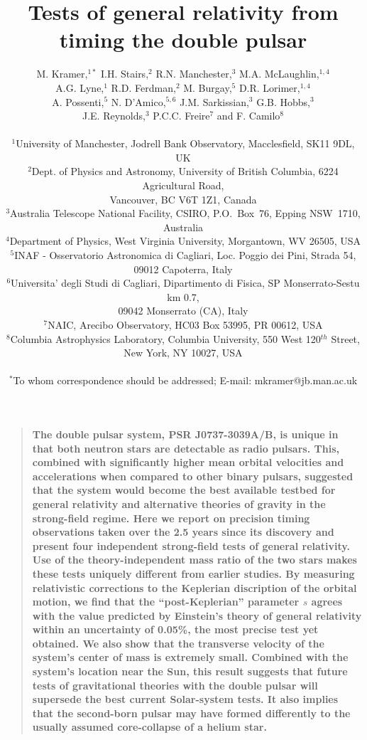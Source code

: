 \documentclass[12pt,psfig]{article}
\title{Tests of general relativity from timing the double pulsar}
\author{M. Kramer,$^{1\ast}$ I.H. Stairs,$^{2}$ R.N. Manchester,$^{3}$
  M.A. McLaughlin,$^{1,4}$ \\
A.G. Lyne,$^{1}$ R.D. Ferdman,$^{2}$ M. Burgay,$^{5}$ D.R. Lorimer,$^{1,4}$ \\
 A. Possenti,$^{5}$  N. D'Amico,$^{5,6}$ 
  J.M. Sarkissian,$^{3}$ G.B. Hobbs,$^{3}$ \\
J.E. Reynolds,$^{3}$ P.C.C. Freire$^{7}$ and F. Camilo$^{8}$ \\
\\
\normalsize{$^{1}$University of Manchester, Jodrell Bank Observatory, Macclesfield, SK11 9DL, UK}\\
\normalsize{$^{2}$Dept. of Physics and Astronomy, University of British
Columbia, 6224 Agricultural Road,}\\
\normalsize{Vancouver, BC V6T 1Z1, Canada}\\
\normalsize{$^{3}$Australia Telescope National Facility, CSIRO, P.O.~Box~76, Epping
NSW~1710, Australia}\\
\normalsize{$^{4}$Department of Physics, West Virginia University, Morgantown,
WV 26505, USA}\\
\normalsize{$^{5}$INAF - Osservatorio Astronomica di Cagliari, Loc. Poggio dei Pini, Strada 54,}\\
\normalsize{09012 Capoterra, Italy}\\
\normalsize{$^{6}$Universita' degli Studi di Cagliari, Dipartimento di Fisica, SP
   Monserrato-Sestu km 0.7,} \\
\normalsize{ 09042 Monserrato (CA), Italy}\\
\normalsize{$^{7}$NAIC, Arecibo Observatory, HC03 Box 53995, PR 00612, USA}\\
\normalsize{$^{8}$Columbia Astrophysics Laboratory, Columbia University, 550 West 120$^{th}$ Street,}\\
\normalsize{New York, NY 10027, USA}\\
\\
\normalsize{$^\ast$To whom correspondence should be addressed; E-mail: mkramer@jb.man.ac.uk}
}
\date{}
\newenvironment{sciabstract}{%
\begin{quote} \bf}
{\end{quote}}
\begin{document}
 


\baselineskip24pt


\maketitle 




\begin{sciabstract}
  The double pulsar system, PSR J0737-3039A/B, is unique in that both neutron
  stars are detectable as radio pulsars. This, combined with significantly
  higher mean orbital velocities and accelerations when compared to other
  binary pulsars, suggested that the system would become the best available
  testbed for general relativity and alternative theories of gravity in the
  strong-field regime. Here we report on precision timing observations taken
  over the 2.5 years since its discovery and present four independent
  strong-field tests of general relativity.  Use of the theory-independent
  mass ratio of the two stars makes these tests uniquely different from
  earlier studies. By measuring relativistic corrections to the Keplerian
  discription of the orbital motion, we find that the ``post-Keplerian''
  parameter $s$ agrees with the value predicted by Einstein's theory of
  general relativity within an uncertainty of 0.05\%, the most precise test
  yet obtained.  We also show that the transverse velocity of the system's
  center of mass is extremely small.  Combined with the system's location near
  the Sun, this result suggests that future tests of gravitational theories
  with the double pulsar will supersede the best current Solar-system tests.
  It also implies that the second-born pulsar may have formed differently to
  the usually assumed core-collapse of a helium star.
\end{sciabstract}
\end{document}
